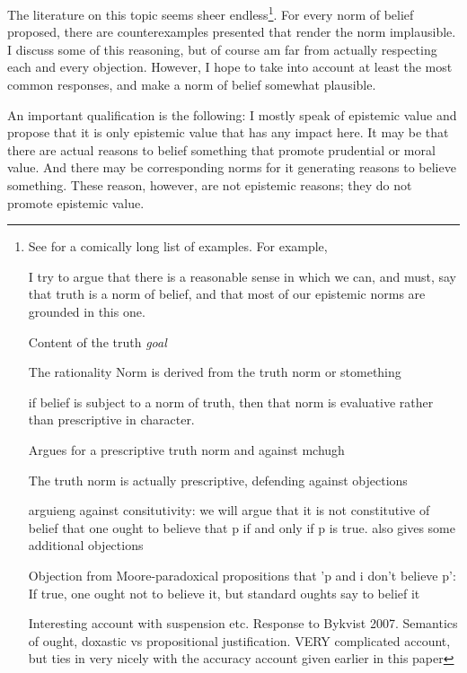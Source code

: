 \documentclass[12pt,numbers=noenddot]{scrartcl}
\begin{document}
The literature on this topic seems sheer endless\footnote{
See \textcite[25]{Mchugh2012-MCHTTN} for a comically long list of examples.
    For example,

\textcite{Engel2001}
I try to argue that there is a reasonable sense in which we can, and must, say that truth is a norm of belief, and that most of our epistemic norms are grounded in this one.

\textcite{David2001-DAVTAT-7}
Content of the truth \emph{goal}

\textcite[101]{Boghossian2008-BOGCAJ}
The rationality Norm is derived from the truth norm or stomething

\textcite{Mchugh2012-MCHTTN}
if belief is subject to a norm of truth, then that norm is evaluative rather than prescriptive in character.

\textcite{Greenberg2016-GREITN}
Argues for a prescriptive truth norm and against mchugh

\textcite{Whiting2013-WHITTA-3}
The truth norm is actually prescriptive, defending against objections

\textcite{Bykvist2007-BYKDTI}
arguieng against consitutivity: we will argue that it is not constitutive of belief that one ought to believe that p if and only if p is true.
also gives some additional objections

Objection from Moore-paradoxical propositions that 'p and i don't believe p': If true, one ought not to believe it, but standard oughts say to belief it

\textcite{Wedgwood2013-WEDTRT}
Interesting account with suspension etc. Response to Bykvist 2007. Semantics of ought, doxastic vs propositional justification. VERY complicated account, but ties in very nicely with the accuracy account given earlier in this paper


}. For every norm of belief proposed, there are counterexamples presented that render the norm implausible. I discuss some of this reasoning, but of course am far from actually respecting each and every objection. However, I hope to take into account at least the most common responses, and make a norm of belief somewhat plausible.

An important qualification is the following: I mostly speak of epistemic value and propose that it is only epistemic value that has any impact here. It may be that there are actual reasons to belief something that promote prudential or moral value. And there may be corresponding norms for it generating reasons to believe something. These reason, however, are not epistemic reasons; they do not promote epistemic value.
\end{document}
